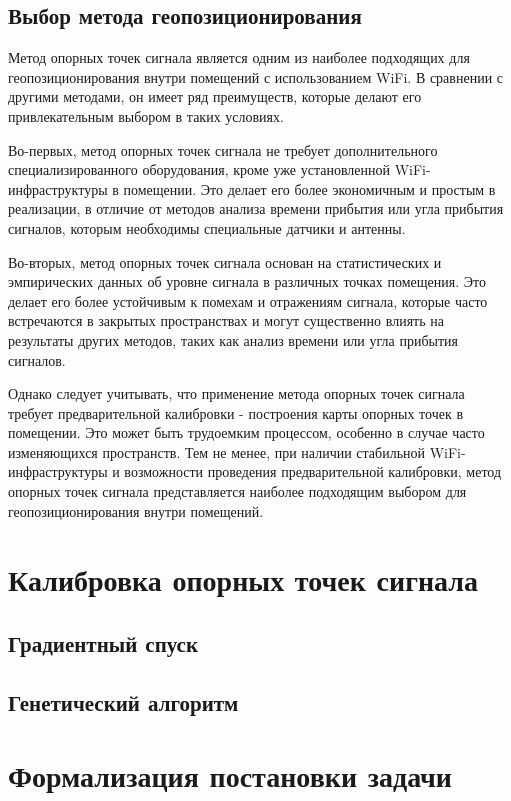 \subsection{Выбор метода геопозиционирования}

Метод опорных точек сигнала является одним из наиболее подходящих для геопозиционирования внутри помещений с использованием WiFi. В сравнении с другими методами, он имеет ряд преимуществ, которые делают его привлекательным выбором в таких условиях.

Во-первых, метод опорных точек сигнала не требует дополнительного специализированного оборудования, кроме уже установленной WiFi-инфраструктуры в помещении. Это делает его более экономичным и простым в реализации, в отличие от методов анализа времени прибытия или угла прибытия сигналов, которым необходимы специальные датчики и антенны.

Во-вторых, метод опорных точек сигнала основан на статистических и эмпирических данных об уровне сигнала в различных точках помещения. Это делает его более устойчивым к помехам и отражениям сигнала, которые часто встречаются в закрытых пространствах и могут существенно влиять на результаты других методов, таких как анализ времени или угла прибытия сигналов.

Однако следует учитывать, что применение метода опорных точек сигнала требует предварительной калибровки - построения карты опорных точек в помещении. Это может быть трудоемким процессом, особенно в случае часто изменяющихся пространств. Тем не менее, при наличии стабильной WiFi-инфраструктуры и возможности проведения предварительной калибровки, метод опорных точек сигнала представляется наиболее подходящим выбором для геопозиционирования внутри помещений.

\section{Калибровка опорных точек сигнала}

\subsection{Градиентный спуск}

\subsection{Генетический алгоритм}

\section{Формализация постановки задачи}

